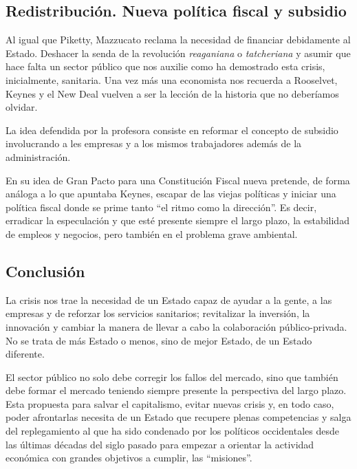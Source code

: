 \documentclass[
]{article}
\begin{document}
\hypertarget{redistribuciuxf3n.-nueva-poluxedtica-fiscal-y-subsidio}{%
\subsection{Redistribución. Nueva política fiscal y
subsidio}\label{redistribuciuxf3n.-nueva-poluxedtica-fiscal-y-subsidio}}

Al igual que Piketty, Mazzucato reclama la necesidad de financiar
debidamente al Estado. Deshacer la senda de la revolución
\emph{reaganiana} o \emph{tatcheriana} y asumir que hace falta un sector
público que nos auxilie como ha demostrado esta crisis, inicialmente,
sanitaria. Una vez más una economista nos recuerda a Rooselvet, Keynes y
el New Deal vuelven a ser la lección de la historia que no deberíamos
olvidar.

La idea defendida por la profesora consiste en reformar el concepto de
subsidio involucrando a les empresas y a los mismos trabajadores además
de la administración.

En su idea de Gran Pacto para una Constitución Fiscal nueva pretende, de
forma análoga a lo que apuntaba Keynes, escapar de las viejas políticas
y iniciar una política fiscal donde se prime tanto ``el ritmo como la
dirección''. Es decir, erradicar la especulación y que esté presente
siempre el largo plazo, la estabilidad de empleos y negocios, pero
también en el problema grave ambiental.

\hypertarget{conclusiuxf3n-1}{%
\subsection{Conclusión}\label{conclusiuxf3n-1}}

La crisis nos trae la necesidad de un Estado capaz de ayudar a la gente,
a las empresas y de reforzar los servicios sanitarios; revitalizar la
inversión, la innovación y cambiar la manera de llevar a cabo la
colaboración público-privada. No se trata de más Estado o menos, sino de
mejor Estado, de un Estado diferente.

El sector público no solo debe corregir los fallos del mercado, sino que
también debe formar el mercado teniendo siempre presente la perspectiva
del largo plazo. Esta propuesta para salvar el capitalismo, evitar
nuevas crisis y, en todo caso, poder afrontarlas necesita de un Estado
que recupere plenas competencias y salga del replegamiento al que ha
sido condenado por los políticos occidentales desde las últimas décadas
del siglo pasado para empezar a orientar la actividad económica con
grandes objetivos a cumplir, las ``misiones''.
\end{document}
